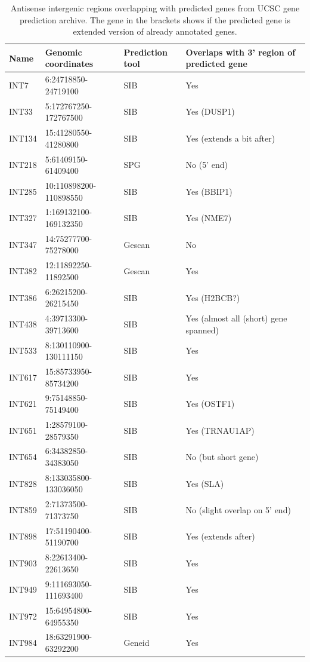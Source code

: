\begin{table}[h]
    \small
    \centering
    \caption{Antisense intergenic regions overlapping with predicted genes from UCSC gene prediction archive.
    The gene in the brackets shows if the predicted gene is extended version of already annotated genes.}
    \label{tab:predictionsAntisense}
    \begin{tabular}{llll}
        \toprule
        Name & Genomic coordinates & Prediction tool & Overlaps with 3' region of predicted gene \\
        \midrule
	INT7 & 6:24718850-24719100 & SIB & Yes \\
	INT33 & 5:172767250-172767500 & SIB & Yes (DUSP1) \\
	INT134 & 15:41280550-41280800 & SIB & Yes (extends a bit after) \\
	INT218 & 5:61409150-61409400 & SPG & No (5' end) \\
	INT285 & 10:110898200-110898550 & SIB & Yes (BBIP1) \\
	INT327 & 1:169132100-169132350 & SIB & Yes (NME7) \\
	INT347 & 14:75277700-75278000 & Gescan & No \\
	INT382 & 12:11892250-11892500 & Gescan & Yes \\
	INT386 & 6:26215200-26215450 & SIB & Yes (H2BCB?) \\
	INT438 & 4:39713300-39713600 & SIB & Yes (almost all (short) gene spanned) \\
	INT533 & 8:130110900-130111150 & SIB & Yes \\
	INT617 & 15:85733950-85734200 & SIB & Yes \\
	INT621 & 9:75148850-75149400 & SIB & Yes (OSTF1) \\
	INT651 & 1:28579100-28579350 & SIB & Yes (TRNAU1AP) \\
	INT654 & 6:34382850-34383050 & SIB & No (but short gene)\\
	INT828 & 8:133035800-133036050 & SIB & Yes (SLA) \\
	INT859 & 2:71373500-71373750 & SIB & No (slight overlap on 5' end) \\
	INT898 & 17:51190400-51190700 & SIB & Yes (extends after)\\
	INT903 & 8:22613400-22613650 & SIB & Yes \\
	INT949 & 9:111693050-111693400 & SIB & Yes \\
	INT972 & 15:64954800-64955350 & SIB & Yes \\
	INT984 & 18:63291900-63292200 & Geneid & Yes \\

\end{tabular}
\end{table}
